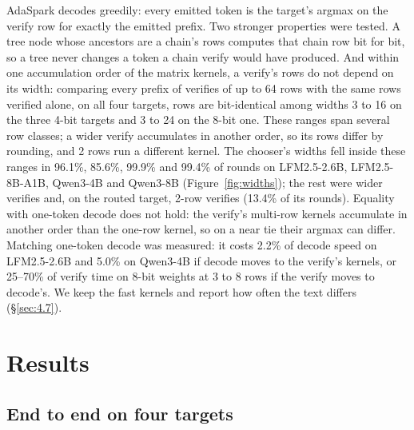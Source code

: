 \documentclass[10pt,twocolumn,letterpaper]{article}
\begin{document}
AdaSpark decodes greedily: every emitted token is the target's argmax on the verify row for exactly the emitted prefix. Two stronger properties were tested. A tree node whose ancestors are a chain's rows computes that chain row bit for bit, so a tree never changes a token a chain verify would have produced. And within one accumulation order of the matrix kernels, a verify's rows do not depend on its width: comparing every prefix of verifies of up to 64 rows with the same rows verified alone, on all four targets, rows are bit-identical among widths 3 to 16 on the three 4-bit targets and 3 to 24 on the 8-bit one. These ranges span several row classes; a wider verify accumulates in another order, so its rows differ by rounding, and 2 rows run a different kernel. The chooser's widths fell inside these ranges in 96.1\%, 85.6\%, 99.9\% and 99.4\% of rounds on LFM2.5-2.6B, LFM2.5-8B-A1B, Qwen3-4B and Qwen3-8B (Figure~\ref{fig:widths}); the rest were wider verifies and, on the routed target, 2-row verifies (13.4\% of its rounds). Equality with one-token decode does not hold: the verify's multi-row kernels accumulate in another order than the one-row kernel, so on a near tie their argmax can differ. Matching one-token decode was measured: it costs 2.2\% of decode speed on LFM2.5-2.6B and 5.0\% on Qwen3-4B if decode moves to the verify's kernels, or 25--70\% of verify time on 8-bit weights at 3 to 8 rows if the verify moves to decode's. We keep the fast kernels and report how often the text differs (\S\ref{sec:4.7}).

\section{Results}\label{sec:4}

\subsection{End to end on four targets}\label{sec:4.1}
\end{document}
